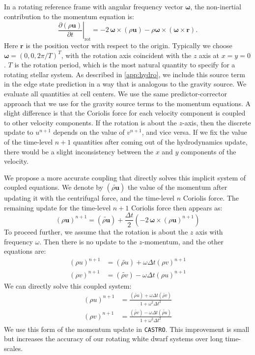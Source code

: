 \documentclass[iop,numberedappendix]{../emulateapj}
\newcommand{\castro}{\texttt{CASTRO}}
\begin{document}
In a rotating reference frame with angular frequency vector $\bm{\omega}$,
the non-inertial contribution to the momentum equation is:
\begin{equation}
  \left.\frac{\partial(\rho \mathbf{u})}{\partial t}\right|_{\text{rot}} = -2\, {\bm\omega} \times (\rho\mathbf{u}) - \rho {\bm\omega} \times \left({\bm\omega} \times \mathbf{r}\right).
\end{equation}
Here $\mathbf{r}$ is the position vector with respect to the origin. Typically we choose $\bm{\omega} = (0, 0, 2\pi / T)^T$,
with the rotation axis coincident with the $z$ axis at $x = y = 0$.
$T$ is the rotation period, which is the most natural quantity to specify
for a rotating stellar system. As described in \autoref{app:hydro}, we include this source term
in the edge state prediction in a way that is analogous to the gravity source.
We evaluate all quantities at cell centers. We use the same predictor-corrector 
approach that we use for the gravity source terms to the momentum equations. A slight 
difference is that the Coriolis force for each velocity component is coupled to other velocity 
components. If the rotation is about the $z$-axis, then the discrete update to 
$u^{n+1}$ depends on the value of $v^{n+1}$, and vice versa. If we fix the value of 
the time-level $n+1$ quantities after coming out of the hydrodynamics update, there 
would be a slight inconsistency between the $x$ and $y$ components of the velocity. 

We propose a more accurate coupling that directly solves this implicit system of coupled 
equations. We denote by $(\widetilde{\rho \mathbf{u}})$ the value of the momentum after 
updating it with the centrifugal force, and the time-level $n$ Coriolis force. The remaining 
update for the time-level $n+1$ Coriolis force then appears as:
\begin{equation}
  (\rho \mathbf{u})^{n+1} = (\widetilde{\rho\mathbf{u}}) + \frac{\Delta t}{2} \left(-2\, {\bm\omega} \times (\rho\mathbf{u})^{n+1}\right)
\end{equation}
To proceed further, we assume that the rotation is about the $z$ axis with frequency $\omega$. 
Then there is no update to the $z$-momentum, and the other equations are:
\begin{align}
  (\rho u)^{n+1} &= (\widetilde{\rho u}) + \omega \Delta t (\rho v)^{n+1} \\
  (\rho v)^{n+1} &= (\widetilde{\rho v}) - \omega \Delta t (\rho u)^{n+1}
\end{align} 
We can directly solve this coupled system:
\begin{align}
  (\rho u)^{n+1} &= \frac{ (\widetilde{\rho u}) + \omega \Delta t (\widetilde{\rho v})}{1 + \omega^2 \Delta t^2} \\
  (\rho v)^{n+1} &= \frac{ (\widetilde{\rho v}) - \omega \Delta t (\widetilde{\rho u})}{1 + \omega^2 \Delta t^2}
\end{align}
We use this form of the momentum update in \castro. This improvement is small
but increases the accuracy of our rotating white dwarf systems over long time-scales.
\end{document}
